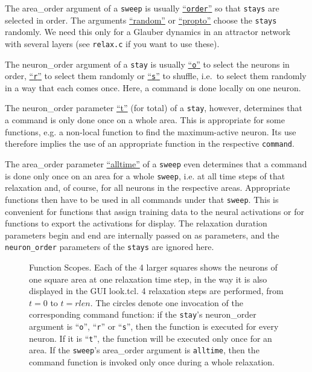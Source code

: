 \documentclass[12pt]{article}
\begin{document}
The {\color{blue} area\_order} argument of a \texttt{sweep} is usually \underline{``\texttt{order}''} so that \texttt{stays} are selected in order.
The arguments \underline{``random''} or \underline{``propto''} choose the \texttt{stays} randomly.
We need this only for a Glauber dynamics in an attractor network with several layers (see \texttt{relax.c} if you want to use these).

The {\color{blue} neuron\_order} argument of a \texttt{stay} is usually
\underline{``\texttt{o}''} to select the neurons in order,
\underline{``\texttt{r}''} to select them randomly or
\underline{``\texttt{s}''} to shuffle, i.e.\ to select them randomly in a way that each comes once.
Here, a command is done locally on one neuron.

The {\color{blue} neuron\_order} parameter \underline{``t''} (for total) of a \texttt{stay}, however, determines that a command is only done once on a whole area.
This is appropriate for some functions, e.g. a non-local function to find the maximum-active neuron.
Its use therefore implies the use of an appropriate function in the respective \texttt{command}.

The {\color{blue} area\_order} parameter \underline{``alltime''} of a \texttt{sweep} even determines that a command is done only once on an area for a whole \texttt{sweep},
i.e. at all time steps of that relaxation and, of course, for all neurons in the respective areas.
Appropriate functions then have to be used in all commands under that \texttt{sweep}.
This is convenient for functions that assign training data to the neural activations or for functions to export the activations for display.
The relaxation duration parameters {\color{blue} begin} and {\color{blue} end} are internally passed on as parameters,
and the \texttt{neuron\_order} parameters of the \texttt{stays} are ignored here.

 \begin{figure}[htb]
 \begin{center}
 \end{center}
 \caption{Function Scopes.
          Each of the 4 larger squares shows the neurons of one square area at one relaxation time step, in the way it is also displayed in the GUI look.tcl.
          4 relaxation steps are performed, from $t = 0$ to $t = rlen$.
          The circles denote one invocation of the corresponding command function:
          if the \texttt{stay}'s {\color{blue} neuron\_order} argument is ``\texttt{o}'', ``\texttt{r}'' or ``\texttt{s}'', then the function is executed for every neuron.
          If it is ``\texttt{t}'', the function will be executed only once for an area.
          If the \texttt{sweep}'s {\color{blue} area\_order} argument is \texttt{alltime}, then the command function is invoked only once during a whole relaxation.
          }
 \label{functionscope}
 \end{figure}
\end{document}
